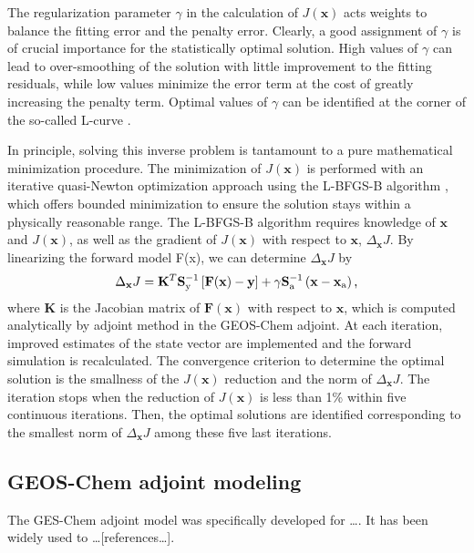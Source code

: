  The regularization parameter $\gamma$ in the calculation of $J(\mathbf{x})$ acts weights
 to balance the fitting error and the penalty error. Clearly, a good assignment of 
 $\gamma$ is of crucial importance for the statistically optimal solution. High values 
 of $\gamma$ can lead to over-smoothing of the solution with little improvement to the
 fitting residuals, while low values minimize the error term at the cost of greatly 
 increasing the penalty term. Optimal values of $\gamma$ can be identified at the 
 corner of the so-called L-curve \citep{hansen98}.

 In principle, solving this inverse problem is tantamount to a pure 
 mathematical minimization procedure. The minimization of $J(\mathbf{x})$ 
 is performed with an iterative quasi-Newton optimization approach 
 using the L-BFGS-B algorithm \citep{byrd95,zhu94}, 
 which offers bounded minimization to ensure the solution stays 
 within a physically reasonable range. The L-BFGS-B algorithm 
 requires knowledge of $\mathbf{x}$ and $J(\mathbf{x})$, 
 as well as the gradient of $J(\mathbf{x})$ with respect to 
 $\mathbf{x}$, $\Delta_\mathbf{x}J$. By linearizing the forward model F(x), 
 we can determine $\Delta_\mathbf{x}J$ by
 \begin{equation} \label{eq:dcost}
  \Delta_\mathbf{x}J = \mathbf{K}^T \mathbf{S}_\text{y}^{-1} \left[ \mathbf{F(x)-y}\right]
                     + \gamma \mathbf{S}_\text{a}^{-1} \left( \mathbf{x}-\mathbf{x}_\text{a} \right) \mbox{,} 
 \end{equation}
 where $\mathbf{K}$ is the Jacobian matrix of $\mathbf{F(x)}$ 
 with respect to $\mathbf{x}$, which is computed analytically by adjoint method 
 in the GEOS-Chem adjoint. At each iteration, improved estimates 
 of the state vector are implemented and the forward simulation is recalculated. 
 The convergence criterion to determine the optimal solution is the smallness 
 of the $J(\mathbf{x})$ reduction and the norm of $\Delta_\mathbf{x}J$. 
 The iteration stops when the reduction of $J(\mathbf{x})$ is less than 1\% within 
 five continuous iterations. Then, the optimal solutions are identified 
 corresponding to the smallest norm of $\Delta_\mathbf{x}J$ among 
 these five last iterations. 

 \subsection{GEOS-Chem adjoint modeling}

 The GES-Chem adjoint model was specifically developed for \ldots \citep{henze07,henze09}.
 It has been widely used to \ldots [references\ldots]. 

